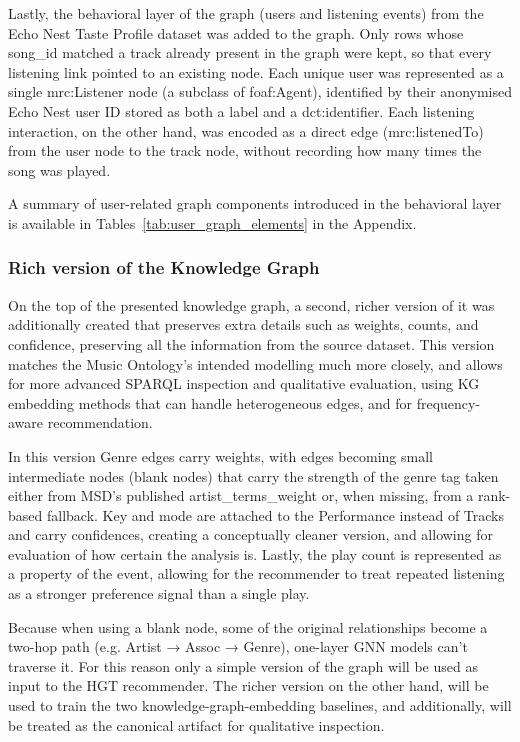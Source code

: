 Lastly, the behavioral layer of the graph (users and listening events) from the Echo Nest Taste Profile dataset was added to the graph. Only rows whose song\_id matched a track already present in the graph were kept, so that every listening link pointed to an existing node. Each unique user was represented as a single mrc:Listener node (a subclass of foaf:Agent), identified by their anonymised Echo Nest user ID stored as both a label and a dct:identifier. Each listening interaction, on the other hand, was encoded as a direct edge (mrc:listenedTo) from the user node to the track node, without recording how many times the song was played.






A summary of user-related graph components introduced in the behavioral layer is available in Tables~\ref{tab:user_graph_elements} in the Appendix.

\subsubsection{Rich version of the Knowledge Graph}

On the top of the presented knowledge graph, a second, richer version of it was additionally created that preserves extra details such as weights, counts, and confidence, preserving all the information from the source dataset. This version matches the Music Ontology's intended modelling much more closely, and allows for more advanced SPARQL inspection and qualitative evaluation, using KG embedding methods that can handle heterogeneous edges, and for frequency-aware recommendation. 

In this version Genre edges carry weights, with edges becoming small intermediate nodes (blank nodes) that carry the strength of the genre tag taken either from MSD's published artist\_terms\_weight or, when missing, from a rank-based fallback. Key and mode are attached to the Performance instead of Tracks and carry confidences, creating a conceptually cleaner version, and allowing for evaluation of how certain the analysis is. Lastly, the play count is represented as a property of the event, allowing for the recommender to treat repeated listening as a stronger preference signal than a single play.

Because when using a blank node, some of the original relationships become a two-hop path (e.g. Artist → Assoc → Genre), one-layer GNN models can't traverse it. For this reason only a simple version of the graph will be used as input to the HGT recommender. The richer version on the other hand, will be used to train the two knowledge-graph-embedding baselines, and additionally, will be treated as the canonical artifact for qualitative inspection.

